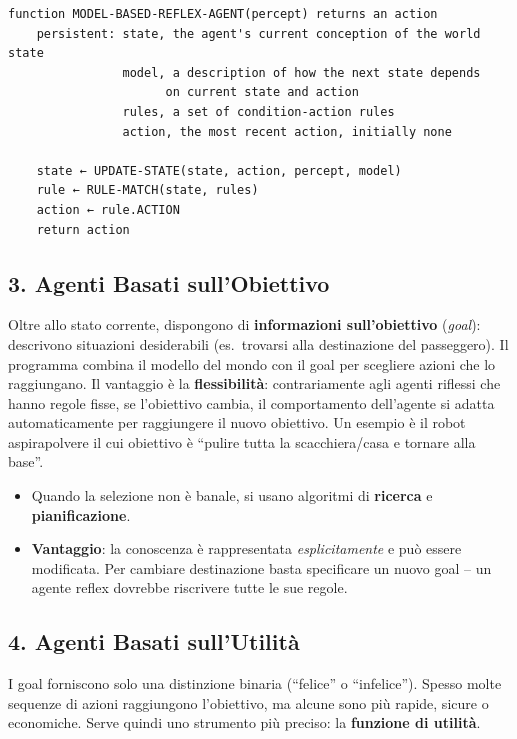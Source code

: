 \begin{exbox}
\begin{verbatim}
function MODEL-BASED-REFLEX-AGENT(percept) returns an action
    persistent: state, the agent's current conception of the world state
                model, a description of how the next state depends 
                      on current state and action
                rules, a set of condition-action rules
                action, the most recent action, initially none
    
    state ← UPDATE-STATE(state, action, percept, model)
    rule ← RULE-MATCH(state, rules)
    action ← rule.ACTION
    return action
\end{verbatim}
\end{exbox}


\subsection{3. Agenti Basati sull'Obiettivo}
Oltre allo stato corrente, dispongono di \textbf{informazioni sull'obiettivo} (\emph{goal}): descrivono situazioni desiderabili (es.\ trovarsi alla destinazione del passeggero). Il programma combina il modello del mondo con il goal per scegliere azioni che lo raggiungano. Il vantaggio è la \textbf{flessibilità}: contrariamente agli agenti riflessi che hanno regole fisse, se l'obiettivo cambia, il comportamento dell'agente si adatta automaticamente per raggiungere il nuovo obiettivo.
Un esempio è il robot aspirapolvere il cui obiettivo è “pulire tutta la scacchiera/casa e tornare alla base”.


\begin{itemize}
    \item Quando la selezione non è banale, si usano algoritmi di \textbf{ricerca} e \textbf{pianificazione}.
    \item \textbf{Vantaggio}: la conoscenza è rappresentata \emph{esplicitamente} e può essere modificata. Per cambiare destinazione basta specificare un nuovo goal -- un agente reflex dovrebbe riscrivere tutte le sue regole.
\end{itemize}


\subsection{4. Agenti Basati sull'Utilità}
I goal forniscono solo una distinzione binaria (``felice'' o ``infelice''). Spesso molte sequenze di azioni raggiungono l'obiettivo, ma alcune sono più rapide, sicure o economiche. Serve quindi uno strumento più preciso: la \textbf{funzione di utilità}.

